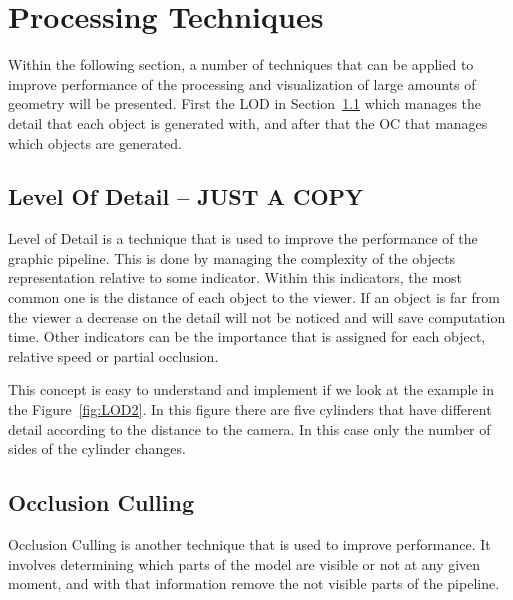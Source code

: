 
\section{Processing Techniques} %
\label{sec:processing_techniques}

Within the following section, a number of techniques that can be applied to improve performance of the processing and visualization of large amounts of geometry will be presented. First the \gls{LOD} in Section~\ref{sub:level_of_detail} which manages the detail that each object is generated with, and after that the \gls{OC} that manages which objects are generated.



\subsection{Level Of Detail -- JUST A COPY} %
\label{sub:level_of_detail}

Level of Detail is a technique that is used to improve the performance of the graphic pipeline. This is done by managing the complexity of the objects representation relative to some indicator.
Within this indicators, the most common one is the distance of each object to the viewer. If an object is far from the viewer a decrease on the detail will not be noticed and will save computation time. Other indicators can be the importance that is assigned for each object, relative speed or partial occlusion.

This concept is easy to understand and implement if we look at the example in the Figure~\ref{fig:LOD2}. In this figure there are five cylinders that have different detail according to the distance to the camera. In this case only the number of sides of the cylinder changes.




\subsection{Occlusion Culling} %
\label{sub:occlusion_culling}

Occlusion Culling is another technique that is used to improve performance. It involves determining which parts of the model are visible or not at any given moment, and with that information remove the not visible parts of the pipeline.

